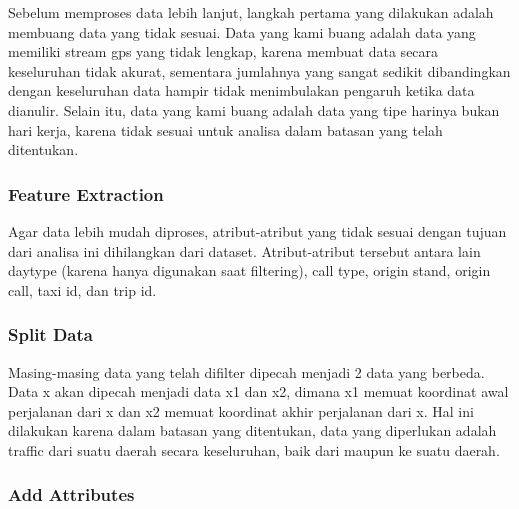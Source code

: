 \documentclass{article}
\begin{document}
\begin{adjustwidth}{4em}{0pt}
	
\hspace{\parindent}Sebelum memproses data lebih lanjut, langkah pertama yang dilakukan adalah membuang data yang tidak sesuai. Data yang kami buang adalah data yang memiliki stream gps yang tidak lengkap, karena membuat data secara keseluruhan tidak akurat, sementara jumlahnya yang sangat sedikit dibandingkan dengan keseluruhan data hampir tidak menimbulakan pengaruh ketika data dianulir. Selain itu, data yang kami buang adalah data yang tipe harinya bukan hari kerja, karena tidak sesuai untuk analisa dalam batasan yang telah ditentukan.

\end{adjustwidth}

\subsubsection{Feature Extraction}

\begin{adjustwidth}{4em}{0pt}
	
	\hspace{\parindent}Agar data lebih mudah diproses, atribut-atribut yang tidak sesuai dengan tujuan dari analisa ini dihilangkan dari dataset. Atribut-atribut tersebut antara lain daytype (karena hanya digunakan saat filtering), call type, origin stand, origin call, taxi id, dan trip id.
	
\end{adjustwidth}

\subsubsection{Split Data}

\begin{adjustwidth}{4em}{0pt}
	
	\hspace{\parindent}Masing-masing data yang telah difilter dipecah menjadi 2 data yang berbeda. Data x akan dipecah menjadi data x1 dan x2, dimana x1 memuat koordinat awal perjalanan dari x dan x2 memuat koordinat akhir perjalanan dari x. Hal ini dilakukan karena dalam batasan yang ditentukan, data yang diperlukan adalah traffic dari suatu daerah secara keseluruhan, baik dari maupun ke suatu daerah.
	
\end{adjustwidth}

\subsubsection{Add Attributes}
\end{document}
